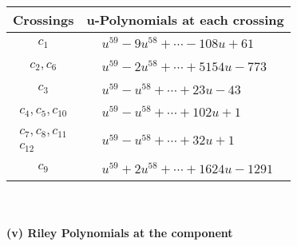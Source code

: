 \documentclass[1p]{elsarticle_modified}
\theoremstyle{definition}
\begin{document}
\begin{tabular}{m{50pt}|m{274pt}}
Crossings & \hspace{64pt}u-Polynomials at each crossing \\
\hline $$\begin{aligned}c_{1}\end{aligned}$$&$\begin{aligned}
&u^{59}-9 u^{58}+\cdots-108 u+61
\end{aligned}$\\
\hline $$\begin{aligned}c_{2},c_{6}\end{aligned}$$&$\begin{aligned}
&u^{59}-2 u^{58}+\cdots+5154 u-773
\end{aligned}$\\
\hline $$\begin{aligned}c_{3}\end{aligned}$$&$\begin{aligned}
&u^{59}- u^{58}+\cdots+23 u-43
\end{aligned}$\\
\hline $$\begin{aligned}c_{4},c_{5},c_{10}\end{aligned}$$&$\begin{aligned}
&u^{59}- u^{58}+\cdots+102 u+1
\end{aligned}$\\
\hline $$\begin{aligned}c_{7},c_{8},c_{11}\\c_{12}\end{aligned}$$&$\begin{aligned}
&u^{59}- u^{58}+\cdots+32 u+1
\end{aligned}$\\
\hline $$\begin{aligned}c_{9}\end{aligned}$$&$\begin{aligned}
&u^{59}+2 u^{58}+\cdots+1624 u-1291
\end{aligned}$\\
\hline
\end{tabular}\\~\\
\newpage\renewcommand{\arraystretch}{1}
\flushleft \textbf{(v) Riley Polynomials at the component}\newline \\
\end{document}
